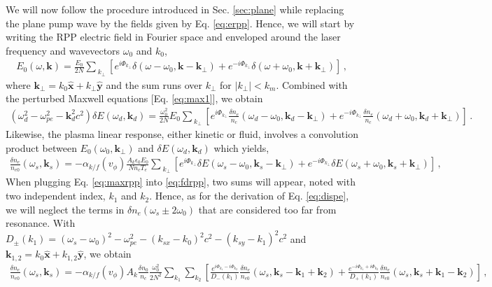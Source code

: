 \documentclass[
 reprint,
 amsmath,amssymb,
 aps,
]{revtex4-1}
\begin{document}
\begin{widetext}
We will now follow the procedure introduced in Sec. \ref{sec:plane} while replacing the plane pump wave by the fields given by Eq. \eqref{eq:erpp}. Hence, we will start by writing the RPP electric field in Fourier space and enveloped around the laser frequency and wavevectors $\omega_0$ and $k_0$,
\begin{align}
E_0(\omega,\mathbf{k}) = \frac{E_0}{2N} \sum_{\ k_{\perp} }[ e^{i\Phi_{k_\perp}}\delta(\omega-\omega_0, \mathbf{k}-\mathbf{k}_\perp)    + e^{-i\Phi_{k_\perp}}\delta(\omega+\omega_0, \mathbf{k}+\mathbf{k}_\perp) ]
\, , \label{eq:erppf}
\end{align}
 where $\mathbf{k}_\perp= k_0\hat{\mathbf{x}} +k_\perp \hat{\mathbf{y}}$ and the sum runs over $k_\perp$ for $\vert k_\perp\vert  <k_m$.
 Combined with the perturbed Maxwell equations [Eq. \eqref{eq:max1}], we obtain
 \begin{align}
    (\omega_d^2 - \omega_{pe}^2 -\mathbf{k}_d^2c^2)\delta E(\omega_d,\mathbf{k}_d) = \frac{\omega_0^2}{2N} E_0 \sum_{\ k_{\perp} }   \left[e^{i\Phi_{k_\perp}}\frac{\delta n_e }{n_c}(\omega_d-\omega_0, \mathbf{k}_d-\mathbf{k}_\perp) +e^{-i\Phi_{k_\perp}}\frac{\delta n_e }{n_c}(\omega_d+\omega_0, \mathbf{k}_d+\mathbf{k}_\perp) \right] \, .\label{eq:maxrpp}
\end{align}
Likewise, the plasma linear response, either kinetic or fluid, involves a convolution product between $E_0(\omega_0,\mathbf{k}_\perp)$ and $\delta E(\omega_d,\mathbf{k}_d)$ which yields,
\begin{align}
   \frac{\delta n_e }{n_{e0}}(\omega_s,\mathbf{k}_s) = -\alpha_{k/f}(v_\phi) \frac{A_k\epsilon_0 E_0}{Nn_c T_e} \sum_{\ k_{\perp} }     \left[e^{i\Phi_{k_\perp}}\delta E(\omega_s-\omega_0, \mathbf{k}_s-\mathbf{k}_{\perp}) +e^{-i\Phi_{k_\perp}}\delta E(\omega_s+\omega_0, \mathbf{k}_s+\mathbf{k}_{\perp}) \right] \, ,\label{eq:fdrpp} 
\end{align}
When plugging Eq. \eqref{eq:maxrpp} into \eqref{eq:fdrpp}, two sums will appear, noted with two independent index, $k_1$ and $k_2$. Hence, as for the derivation of Eq. \eqref{eq:dispe}, we will neglect the terms in $\delta n_e(\omega_s\pm 2\omega_0)$ that are considered too far from resonance. With $D_\pm(k_{1})= (\omega_s-\omega_0)^2 - \omega_{pe}^2 -( k_{sx}-k_0) ^2c^2 -( k_{sy}-k_{1}) ^2c^2$ and $\mathbf{k}_{1,2}= k_0\hat{\mathbf{x}} +k_{1,2} \hat{\mathbf{y}}$, we obtain
\begin{align}
   \frac{\delta n_e }{n_{e0}}(\omega_s,\mathbf{k}_s) = -\alpha_{k/f}(v_\phi)A_k \frac{\delta n_0}{n_c} \frac{\omega_0^2}{2N^2}\sum_{ k_{1} } \sum_{ k_{2} }        \left[ \frac{e^{i\Phi_{k_1}-i\Phi_{k_2}} }{D_-(k_{1})}\frac{\delta n_e }{n_{e0}}(\omega_s,\mathbf{k}_s-\mathbf{k}_{1}+\mathbf{k}_{2}) +\frac{e^{-i\Phi_{k_1}+i\Phi_{k_2}}}{D_+(k_{1})} \frac{\delta n_e }{n_{e0}}(\omega_s,\mathbf{k}_s+\mathbf{k}_{1}-\mathbf{k}_{2}) \right] \, ,\label{eq:fddrpp} 
\end{align}
 \end{widetext}
 
\end{document}
